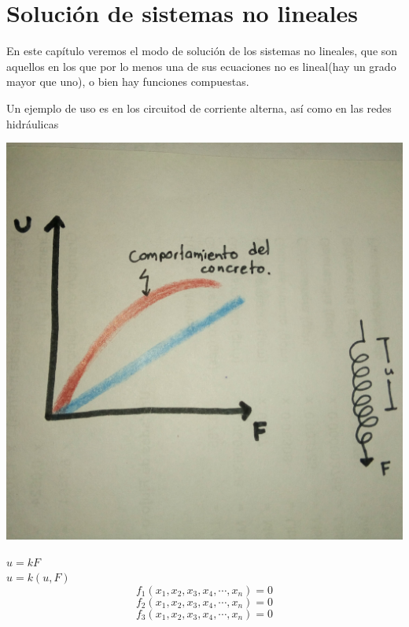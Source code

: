 \chapter{Soluci\'on de sistemas no lineales}

En este cap\'itulo veremos el modo de soluci\'on de los sistemas no lineales, que son aquellos en los que por lo menos una de sus ecuaciones no es lineal(hay un grado mayor que uno), o bien hay funciones compuestas.\\
\begin{center}
Un ejemplo de uso es en los circuitod de corriente alterna, as\'i como en las redes hidr\'aulicas
\begin{center}
\includegraphics[scale=.05]{imagenes/13.jpg}
\end{center}
\end{center}
$u=kF$\\
$u=k(u,F)$\\
\begin{displaymath}
f_1(x_1,x_2,x_3,x_4,\cdots, x_n)=0
\end{displaymath}
\begin{displaymath}
f_2(x_1,x_2,x_3,x_4,\cdots, x_n)=0
\end{displaymath}
\begin{displaymath}
f_3(x_1,x_2,x_3,x_4,\cdots, x_n)=0
\end{displaymath}
